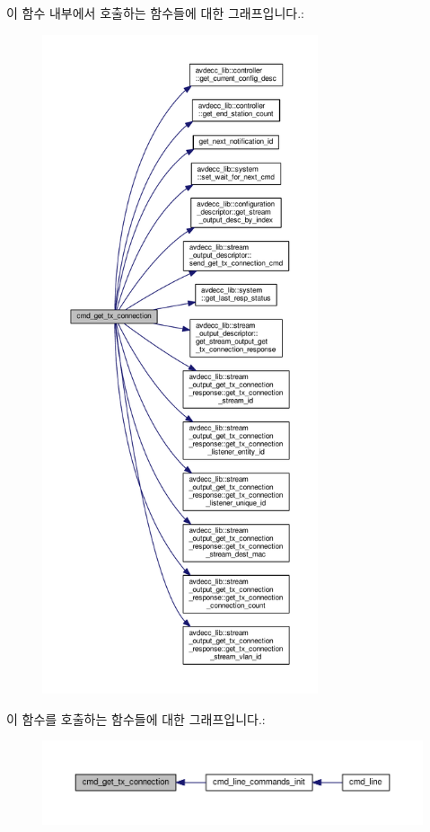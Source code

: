 이 함수 내부에서 호출하는 함수들에 대한 그래프입니다.\+:
\nopagebreak
\begin{figure}[H]
\begin{center}
\leavevmode
\includegraphics[height=550pt]{classcmd__line_afbf6ddf3b87cb81058a69556fde9d9be_cgraph}
\end{center}
\end{figure}




이 함수를 호출하는 함수들에 대한 그래프입니다.\+:
\nopagebreak
\begin{figure}[H]
\begin{center}
\leavevmode
\includegraphics[width=350pt]{classcmd__line_afbf6ddf3b87cb81058a69556fde9d9be_icgraph}
\end{center}
\end{figure}


